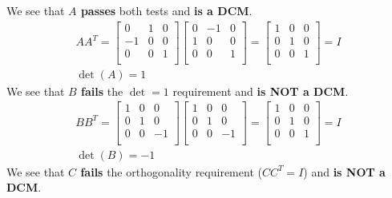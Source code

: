 \documentclass[titlepage]{article}
\begin{document}
\begin{mdframed}[linewidth=1pt, innertopmargin=10pt, innerbottommargin=10pt]
	We see that \textbf{$A$ passes} both tests and \textbf{is a DCM}.
	\begin{equation}
		\begin{gathered}
			AA^T=
			\begin{bmatrix}
				0 & 1 & 0 \\
				-1 & 0 & 0 \\
				0 & 0 & 1 \\
			\end{bmatrix}
			\begin{bmatrix}
				0 & -1 & 0 \\
				1 & 0 & 0 \\
				0 & 0 & 1 \\
			\end{bmatrix}=
			\begin{bmatrix}
				1 & 0 & 0 \\
				0 & 1 & 0 \\
				0 & 0 & 1 \\
			\end{bmatrix}=I\\
			\det(A)=1
		\end{gathered}
	\end{equation}
	We see that \textbf{$B$ fails} the $\det=1$ requirement and \textbf{is NOT a DCM}.
	\begin{equation}
		\begin{gathered}
			BB^T=
			\begin{bmatrix}
				1 & 0 & 0 \\
				0 & 1 & 0 \\
				0 & 0 & -1 \\
			\end{bmatrix}
			\begin{bmatrix}
				1 & 0 & 0 \\
				0 & 1 & 0 \\
				0 & 0 & -1 \\
			\end{bmatrix}=
			\begin{bmatrix}
				1 & 0 & 0 \\
				0 & 1 & 0 \\
				0 & 0 & 1 \\
			\end{bmatrix}=I\\
			\det(B)=-1
		\end{gathered}
	\end{equation}
	We see that \textbf{$C$ fails} the orthogonality requirement ($CC^T=I$) and \textbf{is NOT a DCM}.

\end{mdframed}
\end{document}
